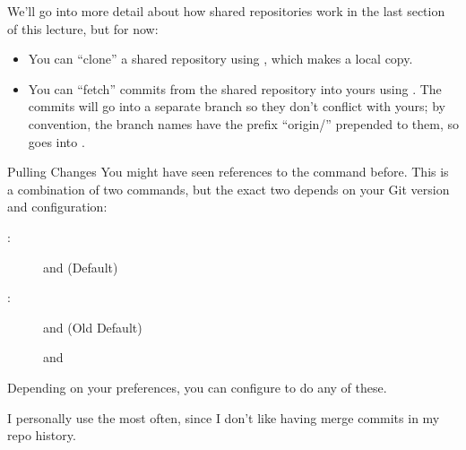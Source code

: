 We'll go into more detail about how shared repositories work in the last
section of this lecture, but for now:
\begin{itemize}
  \item You can \enquote{clone} a shared repository using ,
    which makes a local copy.
  \item You can \enquote{fetch} commits from the shared repository into yours
    using .  The commits will go into a separate branch so they
    don't conflict with yours; by convention, the branch names have the prefix
    \enquote{origin/} prepended to them, so  goes into
    .
\end{itemize}

\begin{frame}{Pulling Changes}
  You might have seen references to the  command before.  This is a combination of two commands, but the exact two depends on your Git version and configuration:
   
  \begin{description}
    \item[:]  and  (Default)
    \item[:]  and  (Old Default)
    \item[]  and 
  \end{description}

  Depending on your preferences, you can configure  to do any of
  these.
\end{frame}

I personally use  the most often, since I don't like
having merge commits in my repo history.


